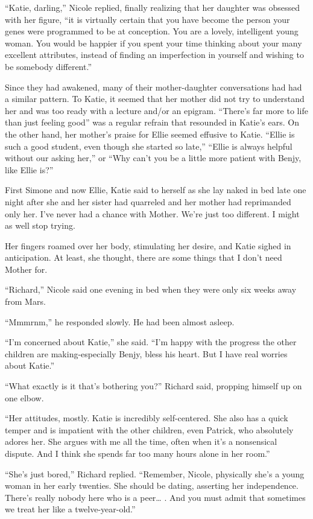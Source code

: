 \documentclass[]{article}
\begin{document}
{“Katie, darling,” Nicole replied, finally realizing that her daughter was obsessed with her figure, “it is virtually certain that you have become the person your genes were programmed to be at conception.  You are a lovely, intelligent young woman.  You would be happier if you spent your time thinking about your many excellent attributes, instead of finding an imperfection in yourself and wishing to be somebody different.”

Since they had awakened, many of their mother-daughter conversations had had a similar pattern.  To Katie, it seemed that her mother did not try to understand her and was too ready with a lecture and/or an epigram.  “There’s far more to life than just feeling good” was a regular refrain that resounded in Katie’s ears.  On the other hand, her mother’s praise for Ellie seemed effusive to Katie.  “Ellie is such a good student, even though she started so late,” “Ellie is always helpful without our asking her,” or “Why can’t you be a little more patient with Benjy, like Ellie is?”

First Simone and now Ellie, Katie said to herself as she lay naked in bed late one night after she and her sister had quarreled and her mother had reprimanded only her.  I’ve never had a chance with Mother.  We’re just too different.  I might as well stop trying.

Her fingers roamed over her body, stimulating her desire, and Katie sighed in anticipation.  At least, she thought, there are some things that I don’t need Mother for.

“Richard,” Nicole said one evening in bed when they were only six weeks away from Mars.

“Mmmrnm,” he responded slowly.  He had been almost asleep.

“I’m concerned about Katie,” she said.  “I’m happy with the progress the other children are making-especially Benjy, bless his heart.  But I have real worries about Katie.”

“What exactly is it that’s bothering you?” Richard said, propping himself up on one elbow.

“Her attitudes, mostly.  Katie is incredibly self-centered.  She also has a quick temper and is impatient with the other children, even Patrick, who absolutely adores her.  She argues with me all the time, often when it’s a nonsensical dispute.  And I think she spends far too many hours alone in her room.”

“She’s just bored,” Richard replied.  “Remember, Nicole, physically she’s a young woman in her early twenties.  She should be dating, asserting her independence.  There’s really nobody here who is a peer… .  And you must admit that sometimes we treat her like a twelve-year-old.”

}
\end{document}
